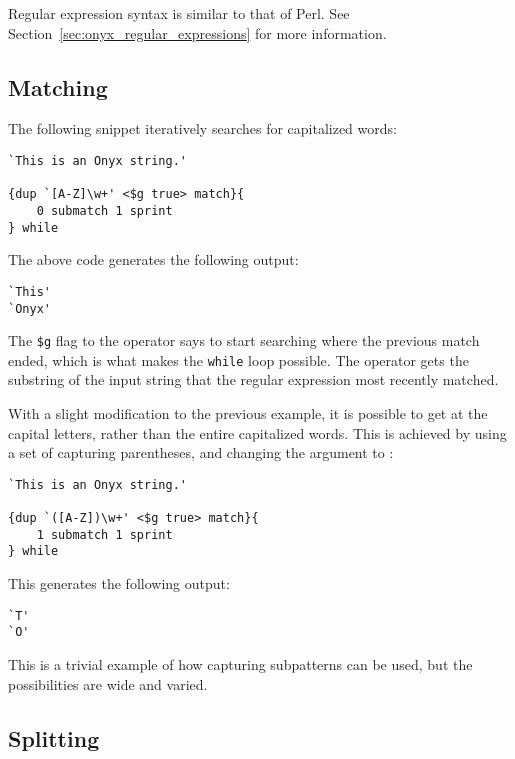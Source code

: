 Regular expression syntax is similar to that of Perl.  See
Section~\ref{sec:onyx_regular_expressions} for more information.

\subsection{Matching}
The following snippet iteratively searches for capitalized words:

\begin{verbatim}
`This is an Onyx string.'

{dup `[A-Z]\w+' <$g true> match}{
    0 submatch 1 sprint
} while
\end{verbatim}

The above code generates the following output:

\begin{verbatim}
`This'
`Onyx'
\end{verbatim}

The {\tt \$g} flag to the 
operator says to start searching where the previous match ended, which is what
makes the {\tt while} loop possible.  The
 operator gets the substring
of the input string that the regular expression most recently matched.

With a slight modification to the previous example, it is possible to get at the
capital letters, rather than the entire capitalized words.  This is achieved by
using a set of capturing parentheses, and changing the argument to
:

\begin{verbatim}
`This is an Onyx string.'

{dup `([A-Z])\w+' <$g true> match}{
    1 submatch 1 sprint
} while
\end{verbatim}

This generates the following output:

\begin{verbatim}
`T'
`O'
\end{verbatim}

This is a trivial example of how capturing subpatterns can be used, but the
possibilities are wide and varied.

\subsection{Splitting}

